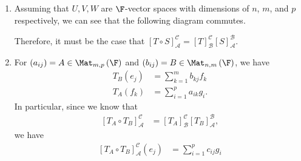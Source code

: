 \documentclass[12pt]{mypackage}
\begin{document}
\begin{solution}\hfill
  \begin{enumerate}[(1)]
    \item Assuming that $U,V,W$ are $\F$-vector spaces with dimensions of $n$, $m$, and $p$ respectively, we can see that the following diagram commutes.
      \begin{center}
      \end{center}
      Therefore, it must be the case that $\left[T\circ S\right]_{\mathcal{A}}^{\mathcal{C}} = \left[T\right]_{\mathcal{B}}^{\mathcal{C}} \left[S\right]_{\mathcal{A}}^{\mathcal{B}}$.
    \item For $\left(a_{ij}\right) = A \in \Mat_{m,p}\left(\F\right)$ and $\left(b_{ij}\right) = B \in \Mat_{n,m}\left(\F\right)$, we have
      \begin{align*}
        T_B\left(e_j\right) &= \sum_{k=1}^{m}b_{kj}f_k\\
        T_A\left(f_k\right) &= \sum_{i=1}^{p}a_{ik}g_i.
      \end{align*}
      In particular, since we know that
      \begin{align*}
        \left[T_A\circ T_B\right]_{\mathcal{A}}^{\mathcal{C}} &= \left[T_A\right]_{\mathcal{B}}^{\mathcal{C}}\left[T_B\right]_{\mathcal{A}}^{\mathcal{B}},
      \end{align*}
      we have
      \begin{align*}
        \left[T_A\circ T_B\right]_{\mathcal{A}}^{\mathcal{C}} \left(e_j\right) &= \sum_{i=1}^{p}c_{ij}g_{i}\\

\end{align*}
\end{enumerate}
\end{solution}
\end{document}
